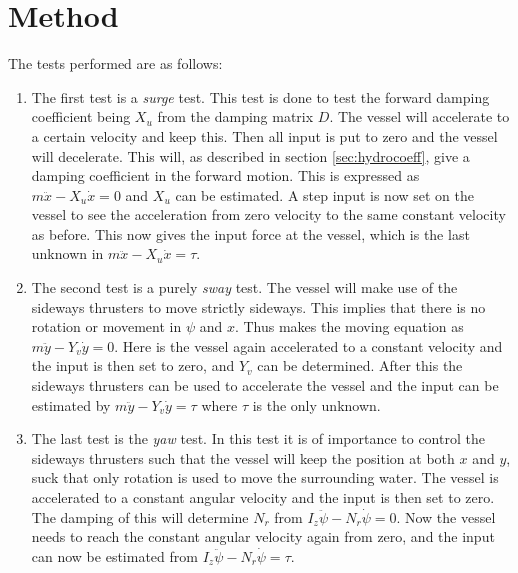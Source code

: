 \section{Method}
The tests performed are as follows:

\begin{enumerate}
	\item The first test is a \textit{surge} test. This test is done to test the forward damping coefficient being $X_u$ from the damping matrix $D$. The vessel will accelerate to a certain velocity and keep this. Then all input is put to zero and the vessel will decelerate. This will, as described in section \ref{sec:hydrocoeff}, give a damping coefficient in the forward motion. This is expressed as $m \ddot x - X_u \dot x = 0$ and $X_u$ can be estimated. A step input is now set on the vessel to see the acceleration from zero velocity to the same constant velocity as before. This now gives the input force at the vessel, which is the last unknown in $m \ddot x - X_u \dot x = \tau$.
	\item The second test is a purely \textit{sway} test. The vessel will make use of the sideways thrusters to move strictly sideways. This implies that there is no rotation or movement in $\psi$ and $x$. Thus makes the moving equation as $m \ddot y - Y_v \dot y = 0$. Here is the vessel again accelerated to a constant velocity and the input is then set to zero, and $Y_v$ can be determined. After this the sideways thrusters can be used to accelerate the vessel and the input can be estimated by $m \ddot y - Y_v \dot y = \tau$ where $\tau$ is the only unknown.
	\item The last test is the \textit{yaw} test. In this test it is of importance to control the sideways thrusters such that the vessel will keep the position at both $x$ and $y$, suck that only rotation is used to move the surrounding water. The vessel is accelerated to a constant angular velocity and the input is then set to zero. The damping of this will determine $N_r$ from $I_z\ddot \psi - N_r \dot \psi = 0$. Now the vessel needs to reach the constant angular velocity again from zero, and the input can now be estimated from $I_z\ddot \psi - N_r \dot \psi = \tau$.
\end{enumerate}

